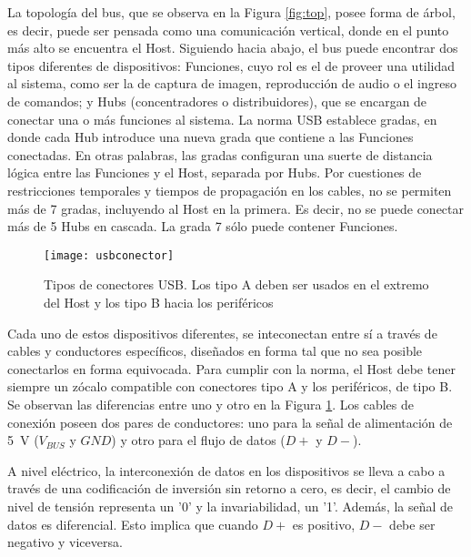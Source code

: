 La topología del bus, que se observa en la Figura \ref{fig:top}, posee forma de árbol, es decir, puede ser pensada como una comunicación vertical, donde en el punto más alto se encuentra el Host. Siguiendo hacia abajo, el bus puede encontrar dos tipos diferentes de dispositivos: Funciones, cuyo rol es el de proveer una utilidad al sistema, como ser la de captura de imagen, reproducción de audio o el ingreso de comandos; y Hubs (concentradores o distribuidores), que se encargan de conectar una o más funciones al sistema. La norma USB establece gradas, en donde cada Hub introduce una nueva grada que contiene a las Funciones conectadas. En otras palabras, las gradas configuran una suerte de distancia lógica entre las Funciones y el Host, separada por Hubs. Por cuestiones de restricciones temporales y tiempos de propagación en los cables, no se permiten más de 7 gradas, incluyendo al Host en la primera. Es decir, no se puede conectar más de 5 Hubs en cascada. La grada 7 sólo puede contener Funciones\cite{USBspec}.%

\begin{figure}[]
	\centering
	\texttt{[image: usbconector]}
	\caption{Tipos de conectores USB. Los tipo A deben ser usados en el extremo del Host y los tipo B hacia los periféricos\cite{USBHardwareWiki}}
	\label{fig:con}
\end{figure}

Cada uno de estos dispositivos diferentes, se inteconectan entre sí a través de cables y conductores específicos, diseñados en forma tal que no sea posible conectarlos en forma equivocada. Para cumplir con la norma, el Host debe tener siempre un zócalo compatible con conectores tipo A y los periféricos, de tipo B. Se observan las diferencias entre uno y otro en la Figura \ref{fig:con}. Los cables de conexión poseen dos pares de conductores: uno para la señal de alimentación de \SI{5}{\volt} ($V_{BUS}$ y $GND$) y otro para el flujo de datos ($D+$ y $D-$).%

A nivel eléctrico, la interconexión de datos en los dispositivos se lleva a cabo a través de una codificación de inversión sin retorno a cero, es decir, el cambio de nivel de tensión representa un '0' y la invariabilidad, un '1'. Además, la señal de datos es diferencial. Esto implica que cuando $D+$ es positivo, $D-$ debe ser negativo y viceversa.%

